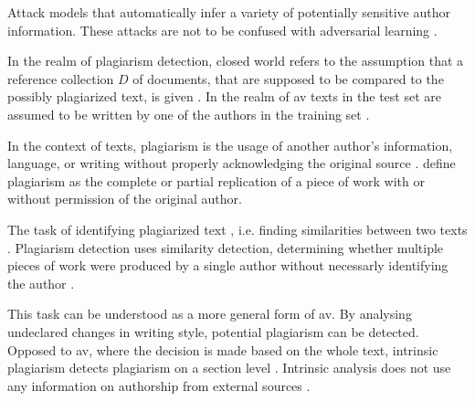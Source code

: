 \begin{definition}
    Attack models that automatically infer a variety of potentially sensitive author information.
    These attacks are not to be confused with adversarial learning \cite{emmery_adversarial_2021}.
\end{definition}

\begin{definition}
    In the realm of plagiarism detection, closed world refers to the assumption 
    that a reference collection $D$ of documents, 
    that are supposed to be compared to the possibly plagiarized text, is given \cite{stein_intrinsic_2011}.
    In the realm of \ac{av} texts in the test set are assumed to be written by one of the authors in the training set \cite{boenninghoff_o2d2_2021}.
\end{definition}

\begin{definition}
    [Plagiarism]
    In the context of texts, plagiarism is the usage of another author's information, language, 
    or writing without properly acknowledging the original source \cite{stein_intrinsic_2011}.
    \citet{elmanarelbouanani_authorship_2014} define plagiarism as the complete or partial replication 
    of a piece of work with or without permission of the original author.
\end{definition}

\begin{definition}
    The task of identifying plagiarized text \cite{stein_intrinsic_2011}, i.e. finding similarities between two texts \cite{stamatatos_survey_2009}.
    Plagiarism detection uses similarity detection, determining whether multiple pieces of work were produced by a single author 
    without necessarly identifying the author \cite{elmanarelbouanani_authorship_2014}.
\end{definition}

\begin{definition}
    This task can be understood as a more general form of \ac{av}.
    By analysing undeclared changes in writing style, potential plagiarism can be detected.
    Opposed to \ac{av}, where the decision is made based on the whole text, 
    intrinsic plagiarism detects plagiarism on a section level \cite{stein_intrinsic_2011}.
    Intrinsic analysis does not use any information on authorship from external sources \cite{zangerle_overview_2024}.
\end{definition}

